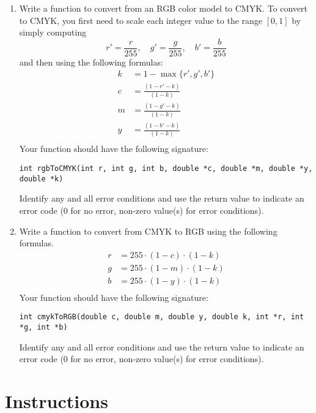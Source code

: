 \documentclass[12pt]{scrartcl}
\begin{document}
\begin{enumerate}
\item Write a function to convert from an RGB color model to CMYK.  To 
convert to CMYK, you first need to scale each integer value to the range 
$[0, 1]$ by simply computing
	$$r' = \frac{r}{255}, \quad g' = \frac{g}{255}, \quad b' = \frac{b}{255}$$
	and then using the following formulas:
\begin{align*}
k & = 1-\max\{r', g', b'\} \\
c & = \frac{(1-r'-k)}{(1-k)} \\
m & = \frac{(1-g'-k)}{(1-k)} \\
y & = \frac{(1-b'-k)}{(1-k)} \\
\end{align*}
Your function should have the following signature:

\texttt{int rgbToCMYK(int r, int g, int b, double *c, double *m, double *y, double *k)}

Identify any and all error conditions and use the return value to indicate
an error code (0 for no error, non-zero value(s) for error conditions).

\item Write a function to convert from CMYK to RGB using the following formulas.
\begin{align*}
r & = 255 \cdot (1 - c) \cdot (1-k) \\
g & = 255 \cdot (1 - m) \cdot (1-k) \\
b & = 255 \cdot (1 - y) \cdot (1-k) \\
\end{align*}
Your function should have the following signature:

\texttt{int cmykToRGB(double c, double m, double y, double k, int *r, int *g, int *b)}

Identify any and all error conditions and use the return value to indicate
an error code (0 for no error, non-zero value(s) for error conditions).

\end{enumerate}



\section*{Instructions}
\end{document}
